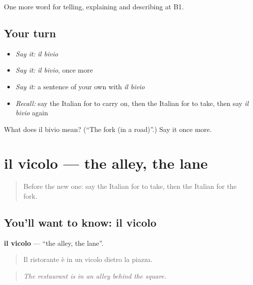 \begin{grammarlens}[title={What you've built}]
One more word for telling, explaining and describing at B1.
\end{grammarlens}

\subsection*{Your turn}
\begin{itemize}
\raggedright
  \item \emph{Say it:} \emph{il bivio}
  \item \emph{Say it:} \emph{il bivio}, once more
  \item \emph{Say it:} a sentence of your own with \emph{il bivio}
  \item \emph{Recall:} say the Italian for to carry on, then the Italian for to take, then say \emph{il bivio} again
\end{itemize}

\begin{tcolorbox}[breakable,colback=teal!4,colframe=teal!35!black,title={Before you move on}]
What does il bivio mean? (\textquotedblleft{}The fork (in a road)\textquotedblright{}.) Say it once more.
\end{tcolorbox}
\section[il vicolo]{il vicolo — the alley, the lane}

\label{lesson:IT-C441-vicolo}



\begin{quote}
Before the new one: say the Italian for to take, then the Italian for the fork.
\end{quote}

\subsection*{You'll want to know: il vicolo}
\textbf{il vicolo} — \textquotedblleft{}the alley, the lane\textquotedblright{}.

\begin{quote}
Il ristorante è in un vicolo dietro la piazza.
\end{quote}

\begin{quote}
\emph{The restaurant is in an alley behind the square.}
\end{quote}

